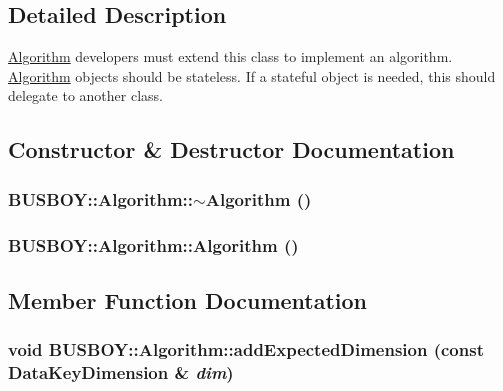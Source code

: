 \subsection{Detailed Description}
\hyperlink{classBUSBOY_1_1Algorithm}{Algorithm} developers must extend this class to implement an algorithm. \hyperlink{classBUSBOY_1_1Algorithm}{Algorithm} objects should be stateless. If a stateful object is needed, this should delegate to another class. 

\subsection{Constructor \& Destructor Documentation}
\hypertarget{classBUSBOY_1_1Algorithm_a08fee31bc80865195e9e953772d322cb}{
\subsubsection[{$\sim$Algorithm}]{\setlength{\rightskip}{0pt plus 5cm}BUSBOY::Algorithm::$\sim$Algorithm ()}}
\label{classBUSBOY_1_1Algorithm_a08fee31bc80865195e9e953772d322cb}
\hypertarget{classBUSBOY_1_1Algorithm_a327e1327a32fcac9d6619690595e331d}{
\subsubsection[{Algorithm}]{\setlength{\rightskip}{0pt plus 5cm}BUSBOY::Algorithm::Algorithm ()}}
\label{classBUSBOY_1_1Algorithm_a327e1327a32fcac9d6619690595e331d}


\subsection{Member Function Documentation}
\hypertarget{classBUSBOY_1_1Algorithm_a13b0943d17037f88df3a98c61379f187}{
\subsubsection[{addExpectedDimension}]{\setlength{\rightskip}{0pt plus 5cm}void BUSBOY::Algorithm::addExpectedDimension (const {\bf DataKeyDimension} \& {\em dim})}}
\label{classBUSBOY_1_1Algorithm_a13b0943d17037f88df3a98c61379f187}


